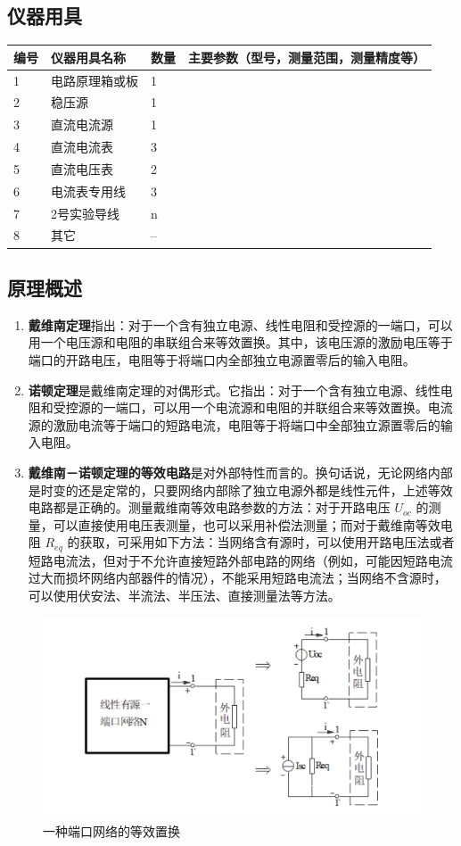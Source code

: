\documentclass[dvipsnames, svgnames,a4paper,11pt]{article}
\begin{document}
	\subsection{仪器用具}
	\begin{table}[htbp]
		\centering
		\renewcommand\arraystretch{1.6}
		\begin{tabular}{p{}p{}|p{}|p{}}
			\hline
			编号& 仪器用具名称 & 数量 &  主要参数（型号，测量范围，测量精度等） \\
			\hline
			1& 电路原理箱或板 & 1 &  \\
			\hline
			2& 稳压源 & 1 &  \\
			\hline
			3& 直流电流源 & 1 &  \\
			\hline
			4& 直流电流表 & 3 &  \\
			\hline
			5& 直流电压表 & 2 &  \\
			\hline
			6& 电流表专用线 & 3 &  \\
			\hline
			7& 2号实验导线 & n &  \\
			\hline
			8& 其它 & -- &  \\
			\hline
		\end{tabular}
	\end{table}
	
	\subsection{原理概述}
	\begin{enumerate}
	\item \textbf{戴维南定理}指出：对于一个含有独立电源、线性电阻和受控源的一端口，可以用一个电压源和电阻的串联组合来等效置换。其中，该电压源的激励电压等于端口的开路电压，电阻等于将端口内全部独立电源置零后的输入电阻。
	\item \textbf{诺顿定理}是戴维南定理的对偶形式。它指出：对于一个含有独立电源、线性电阻和受控源的一端口，可以用一个电流源和电阻的并联组合来等效置换。电流源的激励电流等于端口的短路电流，电阻等于将端口中全部独立源置零后的输入电阻。
	\item \textbf{戴维南－诺顿定理的等效电路}是对外部特性而言的。换句话说，无论网络内部是时变的还是定常的，只要网络内部除了独立电源外都是线性元件，上述等效电路都是正确的。测量戴维南等效电路参数的方法：对于开路电压 $U_{oc}$ 的测量，可以直接使用电压表测量，也可以采用补偿法测量；而对于戴维南等效电阻 $R_{eq}$ 的获取，可采用如下方法：当网络含有源时，可以使用开路电压法或者短路电流法，但对于不允许直接短路外部电路的网络（例如，可能因短路电流过大而损坏网络内部器件的情况），不能采用短路电流法；当网络不含源时，可以使用伏安法、半流法、半压法、直接测量法等方法。
\end{enumerate}
\begin{figure}[H]
	\centering
	\includegraphics[width=0.4\linewidth]{images/一种端口}
	\caption{一种端口网络的等效置换}
	\label{fig:}
\end{figure}
	
\end{document}
